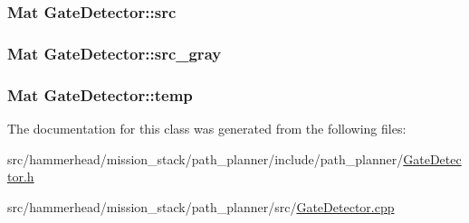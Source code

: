 \subsubsection[{\texorpdfstring{src}{src}}]{\setlength{\rightskip}{0pt plus 5cm}Mat Gate\+Detector\+::src}\hypertarget{classGateDetector_a491a2cf8e4a54f5f9dd40c6db70071b6}{}\label{classGateDetector_a491a2cf8e4a54f5f9dd40c6db70071b6}
\subsubsection[{\texorpdfstring{src\+\_\+gray}{src_gray}}]{\setlength{\rightskip}{0pt plus 5cm}Mat Gate\+Detector\+::src\+\_\+gray}\hypertarget{classGateDetector_ad66d72fc2bd9f66ef5fbf9e012d2deea}{}\label{classGateDetector_ad66d72fc2bd9f66ef5fbf9e012d2deea}
\subsubsection[{\texorpdfstring{temp}{temp}}]{\setlength{\rightskip}{0pt plus 5cm}Mat Gate\+Detector\+::temp}\hypertarget{classGateDetector_a15e463a88c0732623798929ba696f693}{}\label{classGateDetector_a15e463a88c0732623798929ba696f693}


The documentation for this class was generated from the following files\+:\begin{DoxyCompactItemize}
\item 
src/hammerhead/mission\+\_\+stack/path\+\_\+planner/include/path\+\_\+planner/\hyperlink{GateDetector_8h}{Gate\+Detector.\+h}\item 
src/hammerhead/mission\+\_\+stack/path\+\_\+planner/src/\hyperlink{GateDetector_8cpp}{Gate\+Detector.\+cpp}\end{DoxyCompactItemize}
